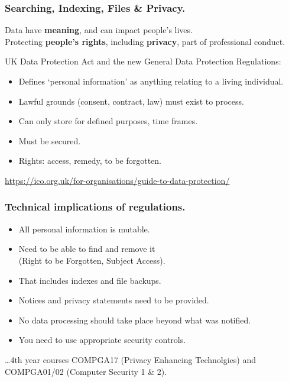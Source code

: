 \documentclass{beamer} %
\newcommand\emc[1]{\textcolor{brightblue}{\textbf{#1}}}
\begin{document}
\begin{frame}
\frametitle{Searching, Indexing, Files \& Privacy.}

Data have \emc{meaning}, and can impact people's lives.\\
Protecting \emc{people's rights}, including \emc{privacy}, part of professional conduct.

\vspace{3mm}
UK Data Protection Act and the new General Data Protection Regulations:
\begin{itemize}
	\item Defines `personal information' as anything relating to a living individual.
	\item Lawful grounds (consent, contract, law) must exist to process.
	\item Can only store for defined purposes, time frames.
	\item Must be secured.
	\item Rights: access, remedy, to be forgotten.
\end{itemize}

{\small \url{https://ico.org.uk/for-organisations/guide-to-data-protection/}}

\end{frame}


\begin{frame}
\frametitle{Technical implications of regulations.}

\begin{itemize}
	\item All personal information is mutable.
	\item Need to be able to find and remove it \\ (Right to be Forgotten, Subject Access).
	\item That includes indexes and file backups.
	\item Notices and privacy statements need to be provided.
	\item No data processing should take place beyond what was notified.
	\item You need to use appropriate security controls.
\end{itemize}
\ldots 4th year courses COMPGA17 (Privacy Enhancing Technolgies) and COMPGA01/02 (Computer Security 1 \& 2).

\end{frame}
\end{document}
